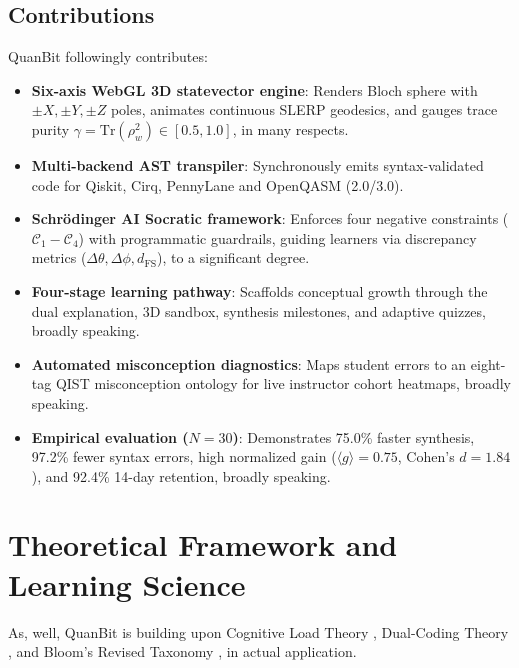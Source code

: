 \documentclass[conference]{IEEEtran}
\begin{document}
\subsection{Contributions}
QuanBit followingly contributes:
\begin{itemize}[leftmargin=*,noitemsep,topsep=1pt]
    \item \textbf{Six-axis WebGL 3D statevector engine}: Renders Bloch sphere with $\pm X, \pm Y, \pm Z$ poles, animates continuous SLERP geodesics, and gauges trace purity $\gamma = \text{Tr}(\rho_w^2) \in [0.5, 1.0]$, in many respects.
    \item \textbf{Multi-backend AST transpiler}: Synchronously emits syntax-validated code for Qiskit, Cirq, PennyLane and OpenQASM (2.0/3.0).
    \item \textbf{Schr{\"o}dinger AI Socratic framework}: Enforces four negative constraints ($\mathcal{C}_1-\mathcal{C}_4$) with programmatic guardrails, guiding learners via discrepancy metrics ($\Delta\theta, \Delta\phi, d_{\text{FS}}$), to a significant degree.
    \item \textbf{Four-stage learning pathway}: Scaffolds conceptual growth through the dual explanation, 3D sandbox, synthesis milestones, and adaptive quizzes, broadly speaking.
    \item \textbf{Automated misconception diagnostics}: Maps student errors to an eight-tag QIST misconception ontology for live instructor cohort heatmaps, broadly speaking.
    \item \textbf{Empirical evaluation ($N=30$)}: Demonstrates 75.0\% faster synthesis, 97.2\% fewer syntax errors, high normalized gain ($\langle g \rangle = 0.75$, Cohen's $d = 1.84$), and 92.4\% 14-day retention, broadly speaking.
\end{itemize}

\section{Theoretical Framework and Learning Science}
\label{sec:theory}

As, well, QuanBit is building upon Cognitive Load Theory \cite{b7}, Dual-Coding Theory \cite{b12}, and Bloom's Revised Taxonomy \cite{b13}, in actual application.
\end{document}
